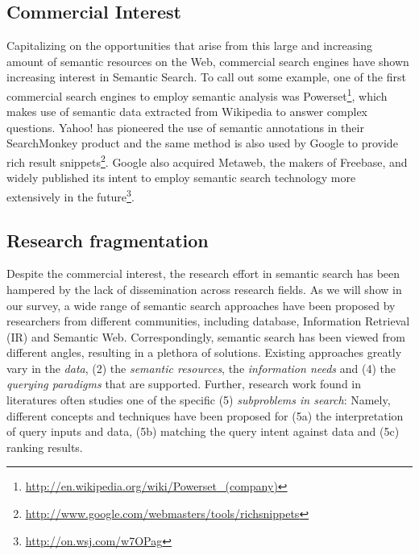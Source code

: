 \subsection{Commercial Interest}

Capitalizing on the opportunities that arise from this large and increasing amount of semantic resources on the Web, commercial search engines have shown increasing interest in Semantic Search. To call out some example, one of the first commercial search engines to employ semantic analysis was Powerset\footnote{\url{http://en.wikipedia.org/wiki/Powerset_(company)}}, which makes use of semantic data extracted from Wikipedia to answer complex questions. Yahoo! has pioneered the use of semantic annotations in their SearchMonkey product and the same method is also used by Google to provide rich result snippets\footnote{\url{http://www.google.com/webmasters/tools/richsnippets}}. Google also acquired Metaweb, the makers of Freebase, and widely published its intent to employ semantic search technology more extensively in the future\footnote{\url{http://on.wsj.com/w7OPag}}. 

\subsection{Research fragmentation}

Despite the commercial interest, the research effort in semantic search has been hampered by the lack of dissemination across research fields. As we will show in our survey, a wide range of semantic search approaches have been proposed by researchers from different communities, including database, Information Retrieval (IR) and Semantic Web. Correspondingly, semantic search has been viewed from different angles, resulting in a plethora of solutions. Existing approaches greatly vary in the \emph{data}, (2) the \emph{semantic resources}, the \emph{information needs} and (4) the \emph{querying paradigms} that are supported. Further, research work found in literatures often studies one of the specific (5) \emph{subproblems in search}: Namely, different concepts and techniques have been proposed for (5a) the interpretation of query inputs and data, (5b) matching the query intent against data and (5c) ranking results.  



